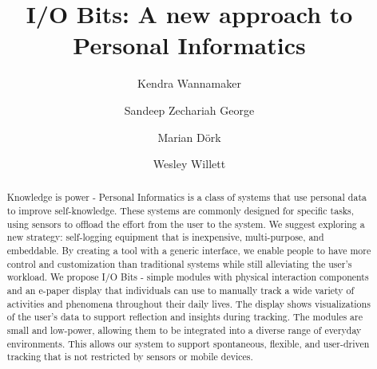 \documentclass[sigchi-a, authorversion]{acmart}
\begin{document}
\title{I/O Bits: A new approach to Personal Informatics}

\author{Kendra Wannamaker}

\author{Sandeep Zechariah George}

\author{Marian Dörk}


\author{Wesley Willett}


\renewcommand{\shortauthors}{F. Author et al.}



\begin{abstract}
Knowledge is power - Personal Informatics is a class of systems that use personal data to improve self-knowledge. These systems are commonly designed for specific tasks, using sensors to offload the effort from the user to the system. We suggest exploring a new strategy: self-logging equipment that is inexpensive, multi-purpose, and embeddable. By creating a tool with a generic interface, we enable people to have more control and customization than traditional systems while still alleviating the user’s workload. We propose I/O Bits - simple modules with physical interaction components and an e-paper display that individuals can use to manually track a wide variety of activities and phenomena throughout their daily lives. The display shows visualizations of the user’s data to support reflection and insights during tracking. The modules are small and low-power, allowing them to be integrated into a diverse range of everyday environments. This allows our system to support spontaneous, flexible, and user-driven tracking that is not restricted by sensors or mobile devices.
\end{abstract}




\maketitle
\end{document}
